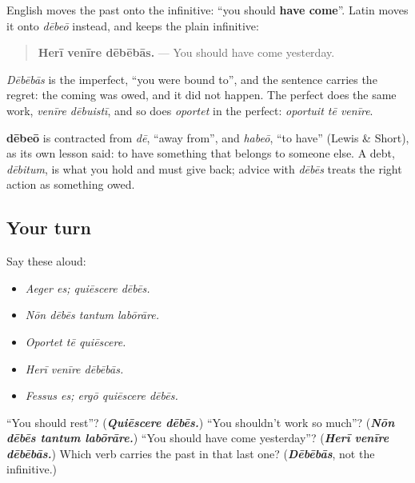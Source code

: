 \begin{grammarlens}[title={Grammar Lens: dēbēbās, you should have}]
English moves the past onto the infinitive: \textquotedblleft{}you should \textbf{have come}\textquotedblright{}. Latin moves it onto \emph{dēbeō} instead, and keeps the plain infinitive:

\begin{quote}
\textbf{Herī venīre dēbēbās.} — You should have come yesterday.
\end{quote}

\emph{Dēbēbās} is the imperfect, \textquotedblleft{}you were bound to\textquotedblright{}, and the sentence carries the regret: the coming was owed, and it did not happen. The perfect does the same work, \emph{venīre dēbuistī}, and so does \emph{oportet} in the perfect: \emph{oportuit tē venīre}.
\end{grammarlens}

\begin{cousinweb}
\textbf{dēbeō} is contracted from \emph{dē}, \textquotedblleft{}away from\textquotedblright{}, and \emph{habeō}, \textquotedblleft{}to have\textquotedblright{} (Lewis \& Short), as its own lesson said: to have something that belongs to someone else. A debt, \emph{dēbitum}, is what you hold and must give back; advice with \emph{dēbēs} treats the right action as something owed.
\end{cousinweb}

\subsection*{Your turn}
Say these aloud:

\begin{itemize}
\raggedright
  \item \emph{Aeger es; quiēscere dēbēs.}
  \item \emph{Nōn dēbēs tantum labōrāre.}
  \item \emph{Oportet tē quiēscere.}
  \item \emph{Herī venīre dēbēbās.}
  \item \emph{Fessus es; ergō quiēscere dēbēs.}
\end{itemize}

\begin{tcolorbox}[breakable,colback=teal!4,colframe=teal!35!black,title={Before you move on}]
\textquotedblleft{}You should rest\textquotedblright{}? (\emph{\textbf{Quiēscere dēbēs.}}) \textquotedblleft{}You shouldn't work so much\textquotedblright{}? (\emph{\textbf{Nōn dēbēs tantum labōrāre.}}) \textquotedblleft{}You should have come yesterday\textquotedblright{}? (\emph{\textbf{Herī venīre dēbēbās.}}) Which verb carries the past in that last one? (\emph{\textbf{Dēbēbās}}, not the infinitive.)
\end{tcolorbox}
